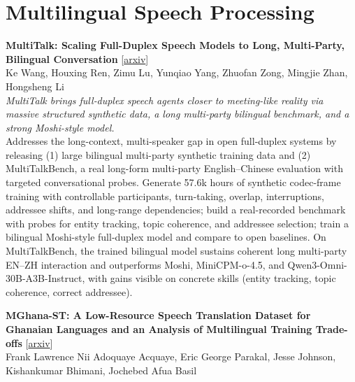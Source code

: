 \documentclass[12pt,letterpaper]{article}
\begin{document}
\medskip


\section*{Multilingual Speech Processing}

{\small\textbf{MultiTalk: Scaling Full-Duplex Speech Models to Long, Multi-Party, Bilingual Conversation}} {\scriptsize[\href{https://arxiv.org/abs/2609.36903}{arxiv}]}\\
{\scriptsize Ke Wang, Houxing Ren, Zimu Lu, Yunqiao Yang, Zhuofan Zong, Mingjie Zhan, Hongsheng Li}\\

{\small\textit{MultiTalk brings full‑duplex speech agents closer to meeting-like reality via massive structured synthetic data, a long multi-party bilingual benchmark, and a strong Moshi-style model.}}\\[1pt]
{\footnotesize Addresses the long-context, multi-speaker gap in open full‑duplex systems by releasing (1) large bilingual multi-party synthetic training data and (2) MultiTalkBench, a real long-form multi-party English--Chinese evaluation with targeted conversational probes. Generate 57.6k hours of synthetic codec-frame training with controllable participants, turn-taking, overlap, interruptions, addressee shifts, and long-range dependencies; build a real-recorded benchmark with probes for entity tracking, topic coherence, and addressee selection; train a bilingual Moshi-style full‑duplex model and compare to open baselines. On MultiTalkBench, the trained bilingual model sustains coherent long multi-party EN--ZH interaction and outperforms Moshi, MiniCPM-o-4.5, and Qwen3-Omni-30B-A3B-Instruct, with gains visible on concrete skills (entity tracking, topic coherence, correct addressee).}

\medskip

{\small\textbf{MGhana-ST: A Low-Resource Speech Translation Dataset for Ghanaian Languages and an Analysis of Multilingual Training Trade-offs}} {\scriptsize[\href{https://arxiv.org/abs/2609.40041}{arxiv}]}\\
{\scriptsize Frank Lawrence Nii Adoquaye Acquaye, Eric George Parakal, Jesse Johnson, Kishankumar Bhimani, Jochebed Afua Basil}\\
\end{document}

